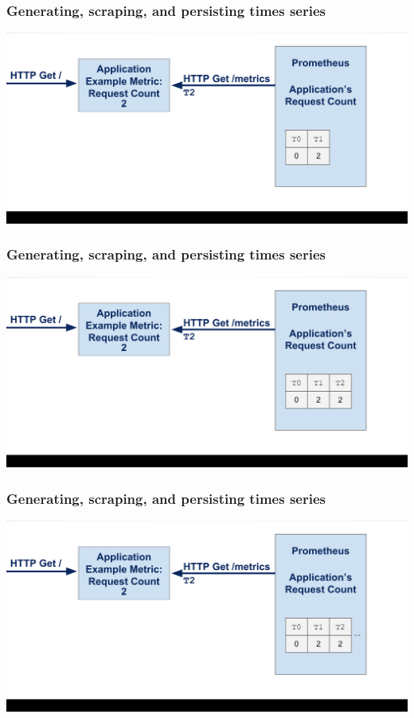 \documentclass[aspectratio=169]{beamer}
\begin{document}
\begin{frame}
        \frametitle{Generating, scraping, and persisting times series}
        \includegraphics[width=\textwidth]{09-cropped.png}
\end{frame}

\begin{frame}
        \frametitle{Generating, scraping, and persisting times series}
        \includegraphics[width=\textwidth]{10-cropped.png}
\end{frame}

\begin{frame}
        \frametitle{Generating, scraping, and persisting times series}
        \includegraphics[width=\textwidth]{11-cropped.png}
\end{frame}
\end{document}
